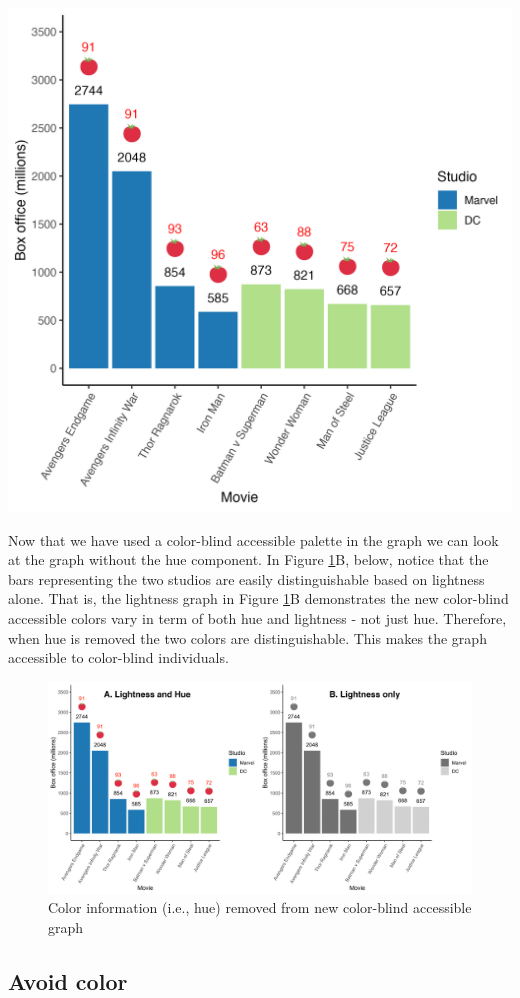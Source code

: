 \documentclass[
]{krantz}
\begin{document}
\includegraphics[width=0.65\linewidth]{ch_graphing/images/emoji_graph5}

Now that we have used a color-blind accessible palette in the graph we can look at the graph without the hue component. In Figure \ref{fig:colorcomparison2}B, below, notice that the bars representing the two studios are easily distinguishable based on lightness alone. That is, the lightness graph in Figure \ref{fig:colorcomparison2}B demonstrates the new color-blind accessible colors vary in term of both hue and lightness - not just hue. Therefore, when hue is removed the two colors are distinguishable. This makes the graph accessible to color-blind individuals.

\begin{figure}
\includegraphics[width=0.75\linewidth]{ch_graphing/images/nocolorcomparison2} \caption{Color information (i.e., hue) removed from new color-blind accessible graph}\label{fig:colorcomparison2}
\end{figure}

\hypertarget{avoid-color}{%
\subsection{Avoid color}\label{avoid-color}}
\end{document}
